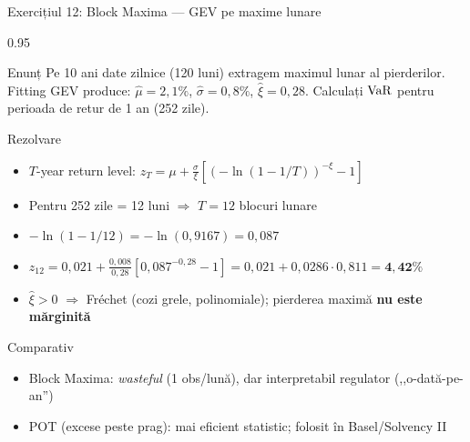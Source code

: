 \documentclass[9pt, aspectratio=169, t]{beamer}
\begin{document}
\begin{frame}[shrink=10]{Exercițiul 12: Block Maxima --- GEV pe maxime lunare}
    \begin{cminipage}{0.95\textwidth}
    \begin{block}{Enunț}
    Pe 10 ani date zilnice (120 luni) extragem maximul lunar al pierderilor. Fitting GEV produce: $\hat{\mu} = 2{,}1\%$, $\hat{\sigma} = 0{,}8\%$, $\hat{\xi} = 0{,}28$. Calculați $\text{VaR}$ pentru perioada de retur de 1 an (252 zile).
    \end{block}
    \begin{exampleblock}{Rezolvare}
    \begin{itemize}\setlength{\itemsep}{0pt}
        \item $T$-year return level: $z_T = \mu + \frac{\sigma}{\xi}\!\left[\left(-\ln(1-1/T)\right)^{-\xi} - 1\right]$
        \item Pentru 252 zile = 12 luni $\Rightarrow$ $T = 12$ blocuri lunare
        \item $-\ln(1 - 1/12) = -\ln(0{,}9167) = 0{,}087$
        \item $z_{12} = 0{,}021 + \frac{0{,}008}{0{,}28}[0{,}087^{-0{,}28} - 1] = 0{,}021 + 0{,}0286 \cdot 0{,}811 = \mathbf{4{,}42\%}$
        \item $\hat{\xi} > 0$ $\Rightarrow$ Fréchet (cozi grele, polinomiale); pierderea maximă \textbf{nu este mărginită}
    \end{itemize}
    \end{exampleblock}
    \begin{alertblock}{Comparativ}
    \begin{itemize}\setlength{\itemsep}{0pt}
        \item Block Maxima: \emph{wasteful} (1 obs/lună), dar interpretabil regulator (,,o-dată-pe-an'')
        \item POT (excese peste prag): mai eficient statistic; folosit în Basel/Solvency II
    \end{itemize}
    \end{alertblock}
    \end{cminipage}
\end{frame}
\end{document}
